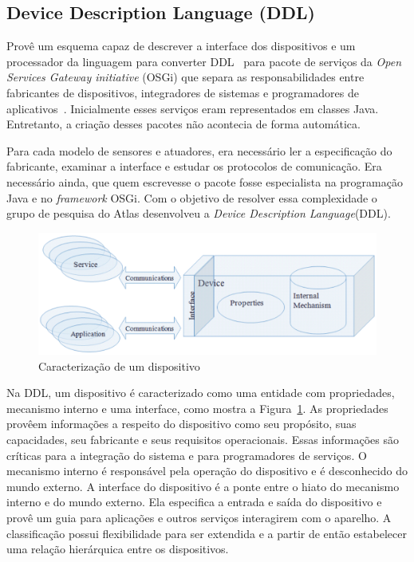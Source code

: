 \subsection{Device Description Language (DDL)}
\label{subsec:ddl}

Provê um esquema capaz de descrever a interface dos dispositivos e um processador da linguagem para converter DDL~\cite{gatorTechDDL} para pacote de serviços da \emph{Open Services Gateway initiative} (OSGi) que separa as responsabilidades entre fabricantes de dispositivos, integradores de sistemas e programadores de aplicativos~\cite{gatorTechDDL}. Inicialmente esses serviços eram representados em classes Java. Entretanto, a criação desses pacotes não acontecia de forma automática. 

Para cada modelo de sensores e atuadores, era necessário ler a especificação do fabricante, examinar a interface e estudar os protocolos de comunicação. Era necessário ainda, que quem escrevesse o pacote fosse especialista na programação Java e no \emph{framework} OSGi. Com o objetivo de resolver essa complexidade o grupo de pesquisa do Atlas desenvolveu a \emph{Device Description Language}(DDL).

\begin{figure}[ht]
\center
\includegraphics[scale=0.4]{imagens/gatorDDL}
\caption{Caracterização de um dispositivo~\cite{ddlSpec}}
\label{fig:ddlspec}
\end{figure}

Na DDL, um dispositivo é caracterizado como uma entidade com propriedades, mecanismo interno e uma interface, como mostra a Figura~\ref{fig:ddlspec}. As propriedades provêem informações a respeito do dispositivo como seu propósito, suas capacidades, seu fabricante e seus requisitos operacionais. Essas informações são críticas para a integração do sistema e para programadores de serviços. O mecanismo interno é responsável pela operação do dispositivo e é desconhecido do mundo externo. A interface do dispositivo é a ponte entre o hiato do mecanismo interno e do mundo externo. Ela especifica a entrada e saída do dispositivo e provê um guia para aplicações e outros serviços interagirem com o aparelho. A classificação possui flexibilidade para ser extendida e a partir de então estabelecer uma relação hierárquica entre os dispositivos.

